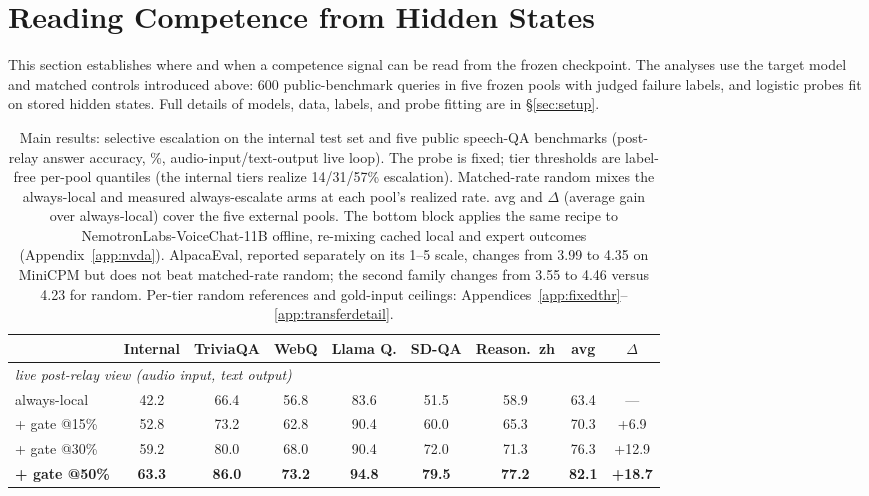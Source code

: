 \section{Reading Competence from Hidden States}
\label{sec:signal}

This section establishes where and when a competence signal can be
read from the frozen checkpoint. The analyses use the target model and
matched controls introduced above: 600 public-benchmark queries in
five frozen pools with judged failure labels, and logistic probes fit
on stored hidden states. Full details of models, data, labels, and
probe fitting are in \S\ref{sec:setup}.

\begin{table}[t]
\centering\scriptsize
\setlength{\tabcolsep}{3.5pt}
\renewcommand{\arraystretch}{0.92}
\caption{Main results: selective escalation on the internal test set
and five public speech-QA benchmarks (post-relay answer accuracy, \%,
audio-input/text-output live loop). The probe is fixed; tier
thresholds are label-free per-pool quantiles (the internal tiers
realize 14/31/57\% escalation). Matched-rate random mixes the
always-local and measured always-escalate arms at each pool's
realized rate. avg and $\Delta$ (average gain over always-local)
cover the five external pools. The bottom block applies the same
recipe to NemotronLabs-VoiceChat-11B offline, re-mixing cached local
and expert outcomes (Appendix~\ref{app:nvda}). AlpacaEval, reported
separately on its 1--5 scale, changes from 3.99 to 4.35 on MiniCPM
but does not beat matched-rate random; the second family changes from
3.55 to 4.46 versus 4.23 for random. Per-tier random references and
gold-input ceilings:
Appendices~\ref{app:fixedthr}--\ref{app:transferdetail}.}
\label{tab:transfer}
\begin{tabular}{lcccccccc}
\toprule
& Internal & TriviaQA & WebQ & Llama Q. & SD-QA & Reason.\ zh & avg & $\Delta$ \\
\midrule
\multicolumn{9}{l}{\emph{live post-relay view (audio input, text output)}} \\
always-local          & 42.2 & 66.4 & 56.8 & 83.6 & 51.5 & 58.9 & 63.4 & --- \\
\;+ gate @15\%        & 52.8 & 73.2 & 62.8 & 90.4 & 60.0 & 65.3 & 70.3 & +6.9 \\
\;+ gate @30\%        & 59.2 & 80.0 & 68.0 & 90.4 & 72.0 & 71.3 & 76.3 & +12.9 \\
\;\textbf{+ gate @50\%} & \textbf{63.3} & \textbf{86.0} & \textbf{73.2} & \textbf{94.8} & \textbf{79.5} & \textbf{77.2} & \textbf{82.1} & \textbf{+18.7} \\

\end{tabular}
\end{table}
